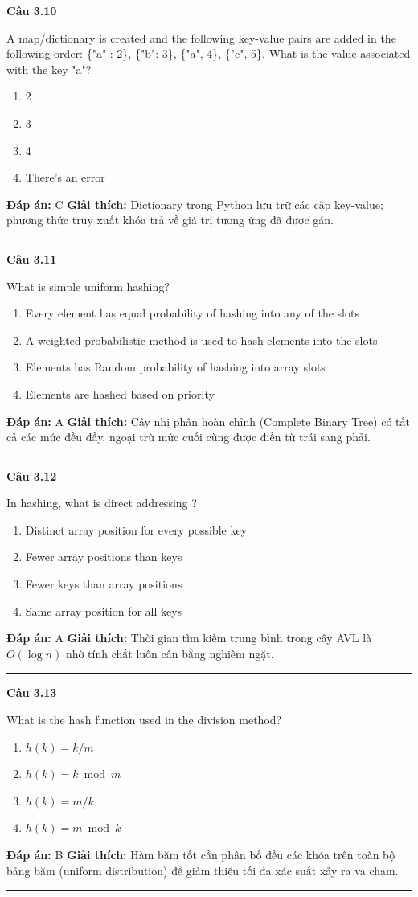 \documentclass[11pt,a4paper]{article}
\newenvironment{question}[1]{%
  \par\vspace{1em}\noindent\textbf{\large Câu #1}\par\vspace{0.4em}
}{%
  \par\vspace{1em}\hrule\vspace{0.6em}
}
\newenvironment{choices}{%
  \begin{enumerate}[label=\textbf{\Alph*.},leftmargin=2.2em,itemsep=2pt,topsep=3pt]
}{%
  \end{enumerate}
}
\newcommand{\choice}{\item}
\begin{document}
\begin{question}{3.10}
A map/dictionary is created and the following key-value pairs are added in the following order: \{"a" : 2\}, \{"b": 3\}, \{"a", 4\}, \{"c", 5\}. What is the value associated with the key "a"?
\begin{choices}
\choice 2
\choice 3
\choice 4
\choice There's an error
\end{choices}
\textbf{Đáp án:} C
\textbf{Giải thích:} Dictionary trong Python lưu trữ các cặp key-value; phương thức truy xuất khóa trả về giá trị tương ứng đã được gán.
\end{question}

\begin{question}{3.11}
What is simple uniform hashing?
\begin{choices}
\choice Every element has equal probability of hashing into any of the slots
\choice A weighted probabilistic method is used to hash elements into the slots
\choice Elements has Random probability of hashing into array slots
\choice Elements are hashed based on priority
\end{choices}
\textbf{Đáp án:} A
\textbf{Giải thích:} Cây nhị phân hoàn chỉnh (Complete Binary Tree) có tất cả các mức đều đầy, ngoại trừ mức cuối cùng được điền từ trái sang phải.
\end{question}

\begin{question}{3.12}
In hashing, what is direct addressing ?
\begin{choices}
\choice Distinct array position for every possible key
\choice Fewer array positions than keys
\choice Fewer keys than array positions
\choice Same array position for all keys
\end{choices}
\textbf{Đáp án:} A
\textbf{Giải thích:} Thời gian tìm kiếm trung bình trong cây AVL là $O(\log n)$ nhờ tính chất luôn cân bằng nghiêm ngặt.
\end{question}

\begin{question}{3.13}
What is the hash function used in the division method?
\begin{choices}
\choice $h(k) = k/m$
\choice $h(k) = k \bmod m$
\choice $h(k) = m/k$
\choice $h(k) = m \bmod k$
\end{choices}
\textbf{Đáp án:} B
\textbf{Giải thích:} Hàm băm tốt cần phân bố đều các khóa trên toàn bộ bảng băm (uniform distribution) để giảm thiểu tối đa xác suất xảy ra va chạm.
\end{question}
\end{document}
